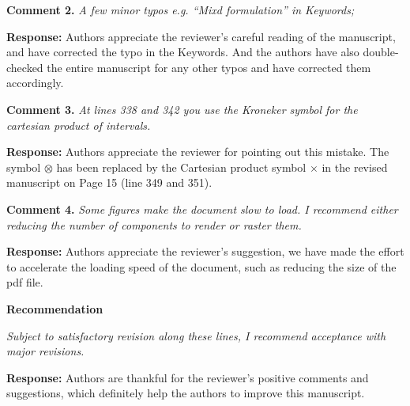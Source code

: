 \documentclass{article}
\begin{document}
\textbf{Comment 2.} \textit{
A few minor typos e.g. “Mixd formulation” in Keywords;
}

\textbf{Response:} Authors appreciate the reviewer's careful reading of the manuscript, and have corrected the typo in the Keywords.
And the authors have also double-checked the entire manuscript for any other typos and have corrected them accordingly.

\textbf{Comment 3.} \textit{
At lines 338 and 342 you use the Kroneker symbol for the cartesian product of intervals.
}

\textbf{Response:} Authors appreciate the reviewer for pointing out this mistake.
The symbol $\otimes$ has been replaced by the Cartesian product symbol $\times$ in the revised manuscript on Page 15 (line 349 and 351).

\textbf{Comment 4.} \textit{
Some figures make the document slow to load. I recommend either reducing the number of components to render or raster them.
}

\textbf{Response:} Authors appreciate the reviewer's suggestion, 
we have made the effort to accelerate the loading speed of the document, such as reducing the size of the pdf file. 

\textbf{Recommendation}

\textit{
Subject to satisfactory revision along these lines, I recommend acceptance with major revisions.
}

\textbf{Response:} 
Authors are thankful for the reviewer's positive comments and suggestions, which definitely help the authors to improve this manuscript.



\end{document}
